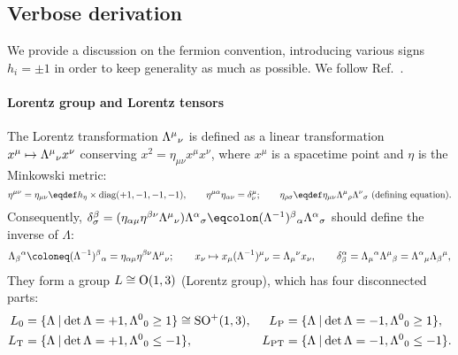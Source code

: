 \documentclass[CheatSheet]{subfiles}
\begin{document}
\newpage
\detailstyle

\subsection{Verbose derivation}
We provide a discussion on the fermion convention, introducing various signs $h_i=\pm1$ in order to keep generality as much as possible. We follow Ref.~\cite{Kugo1}.

\paragraph{Lorentz group and Lorentz tensors}
The Lorentz transformation $\Lambda^{\mu}{}_{\nu}$ is defined as a linear transformation $x^\mu\mapsto\Lambda^{\mu}{}_{\nu} x^\nu$ conserving $x^2=\eta_{\mu\nu}x^\mu x^\nu$, where $x^\mu$ is a spacetime point and $\eta$ is the Minkowski metric:
\begin{equation}
 \eta^{\mu\nu}=\eta_{\mu\nu}\eqdef h_\eta\times\diag(+1,-1,-1,-1),\qquad
 \eta^{\mu\alpha}\eta_{\alpha\nu}=\delta^{\mu}_\nu;\qquad
 \eta_{\rho\sigma}\eqdef\eta_{\mu\nu}\LorTr\mu\rho\LorTr\nu\sigma ~\text{(defining equation)}.
\label{eq:LorTr}
\end{equation}
Consequently, $
  \delta^\beta_\sigma
  = (\eta_{\alpha\mu}\eta^{\beta\nu}\LorTr\mu\nu)\LorTr\alpha\sigma
  \eqcolon (\Lambda^{-1})^\beta{}_\alpha\LorTr\alpha\sigma$
should define the inverse of $\Lambda$:
\begin{equation}
  \Lambda_\beta{}^\alpha
  \deq (\Lambda^{-1})^\beta{}_\alpha
  = \eta_{\alpha\mu}\eta^{\beta\nu}\LorTr\mu\nu;
  \qquad
  x_\nu
  \mapsto x_\mu(\Lambda^{-1})^\mu{}_\nu
  =\Lambda_\mu{}^\nu x_\nu,\qquad
  \delta^\alpha_\beta
  =\Lambda_\mu{}^\alpha\LorTr\mu\beta
  =\LorTr\alpha\mu \Lambda_\beta{}^\mu,
\end{equation}
They form a group $L\cong\operatorname{\mathrm O}(1,3)$ (Lorentz group), which has four disconnected parts:
\begin{align}
 L\w 0  &=\{\Lambda\mathbin|\det\Lambda=+1, \LorTr00\ge1\}\cong \mathop{\mathrm{SO^+}}(1,3),&
 L\w P  &=\{\Lambda\mathbin|\det\Lambda=-1, \LorTr00\ge1\},\notag\\
 L\w T  &=\{\Lambda\mathbin|\det\Lambda=+1, \LorTr00\le-1\},&
 L\w{PT}&=\{\Lambda\mathbin|\det\Lambda=-1, \LorTr00\le-1\}.
\label{eq:lorentz4parts}
\end{align}
\end{document}
